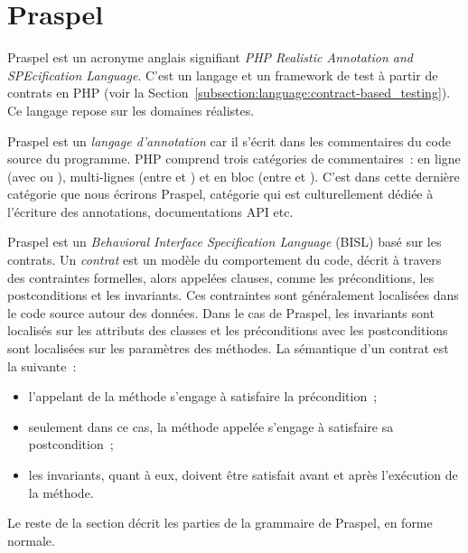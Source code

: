 \def\gsep{$\quad::=\quad$}
\def\mvert{$\;\;|\;\;$}
\newcommand{\token}[1]{\underline{\code{php-#1}}}
\newcommand{\grule}[1]{\textit{#1}}

\section{Praspel}
\label{section:language:praspel}

Praspel est un acronyme anglais signifiant {\em PHP Realistic Annotation and
SPEcification Language}. C'est un langage et un framework de test à partir de
contrats en PHP (voir la
Section~\ref{subsection:language:contract-based_testing}). Ce langage repose
sur les domaines réalistes.

Praspel est un {\em langage d'annotation} car il s'écrit dans les commentaires
du code source du programme. PHP comprend trois catégories de commentaires~: en
ligne (avec \code{//} ou \code{\#}), multi-lignes (entre \code{/*} et \code{*/})
et en bloc (entre \code{/**} et \code{*/}). C'est dans cette dernière catégorie
que nous écrirons Praspel, catégorie qui est culturellement dédiée à l'écriture
des annotations, documentations API etc.

Praspel est un {\em Behavioral Interface Specification Language} (BISL) basé sur
les contrats. Un {\em contrat} est un modèle du comportement du code, décrit à
travers des contraintes formelles, alors appelées clauses, comme les
préconditions, les postconditions et les invariants. Ces contraintes sont
généralement localisées dans le code source autour des données. Dans le cas de
Praspel, les invariants sont localisés sur les attributs des classes et les
préconditions avec les postconditions sont localisées sur les paramètres des
méthodes. La sémantique d'un contrat est la suivante~:

\begin{itemize}

\item l'appelant de la méthode s'engage à satisfaire la précondition~;

\item seulement dans ce cas, la méthode appelée s'engage à satisfaire sa
postcondition~;

\item les invariants, quant à eux, doivent être satisfait avant et après
l'exécution de la méthode.

\end{itemize}

Le reste de la section décrit les parties de la grammaire de Praspel, en forme
normale.

